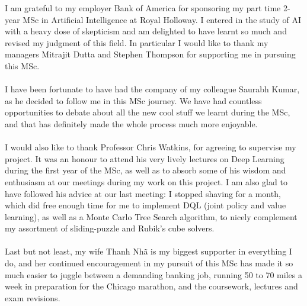 \documentclass[
11pt, %
english, %
singlespacing, %
headsepline, %
]{MastersDoctoralThesis} %
\begin{document}
\begin{acknowledgements}
\addchaptertocentry{\acknowledgementname} %
I am grateful to my employer Bank of America for sponsoring my part time 2-year MSc in Artificial Intelligence at Royal Holloway. I entered in the study of AI with a heavy dose of skepticism and am delighted to have learnt so much and revised my judgment of this field.
In particular I would like to thank my managers Mitrajit Dutta and Stephen Thompson for supporting me in pursuing this MSc.
\\
\\
I have been fortunate to have had the company of my colleague Saurabh Kumar, as he decided to follow me in this MSc journey. We have had countless opportunities to debate about all the new cool stuff we learnt during the MSc, and that has definitely made the whole process much more enjoyable.
\\
\\
I would also like to thank Professor Chris Watkins, for agreeing to supervise my project. It was an honour to attend his very lively lectures on Deep Learning during the first year of the MSc, as well as to absorb some of his wisdom and enthusiasm at our meetings during my work on this project. I am also glad to have followed his advice at our last meeting: I stopped shaving for a month, which did free enough time for me to implement DQL (joint policy and value learning), as well as a Monte Carlo Tree Search algorithm, to nicely complement my assortment of sliding-puzzle and Rubik's cube solvers.
\\
\\
Last but not least, my wife Thanh Nh\~a is my biggest supporter in everything I do, and her continued encouragement in my pursuit of this MSc has made it so much easier to juggle between a demanding banking job, running 50 to 70 miles a week in preparation for the Chicago marathon, and the coursework, lectures and exam revisions.
\end{acknowledgements}



\end{document}
